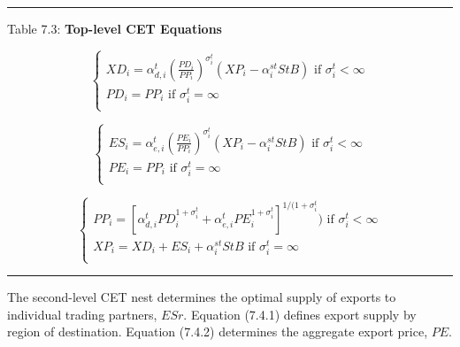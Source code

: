 \documentclass{article}
\begin{document}
\newpage
\noindent\rule{\linewidth}{0.4pt}
\begin{center}
\begin{large}
{\centering Table 7.3: \textbf{Top-level CET Equations} \par}

\begin{equation}
    \begin{cases}
      XD_i = \alpha^t_{d, i} \left(\frac{PD_i}{PP_i} \right)^{\sigma^t_i} \left(XP_i - \alpha^{st}_i StB \right) \text{ if } \sigma^t_i < \infty\\
      PD_i = PP_i \text{ if } \sigma^t_i = \infty\\
    \end{cases}       
    \tag{7.3.1}
\end{equation}

\begin{equation}
    \begin{cases}
      ES_i = \alpha^t_{e, i} \left(\frac{PE_i}{PP_i} \right)^{\sigma^t_i} \left(XP_i - \alpha^{st}_i StB \right) \text{ if } \sigma^t_i < \infty\\
      PE_i = PP_i \text{ if } \sigma^t_i = \infty\\
    \end{cases}       
    \tag{7.3.2} 
\end{equation}

\begin{equation}
    \begin{cases}
      PP_i = \left[\alpha^t_{d, i} PD^{1 + \sigma^t_i}_i + \alpha^t_{e, i} PE^{1 + \sigma^t_i}_i \right]^{1/(1+ \sigma^t_i}) \text{ if } \sigma^t_i < \infty\\
      XP_i = XD_i +ES_i + \alpha^{st}_i StB \text{ if } \sigma^t_i = \infty\\
    \end{cases}       
    \tag{7.3.3}
\end{equation}

\end{large}
\end{center}
\noindent\rule{\linewidth}{0.4pt}

The second-level CET nest determines the optimal supply of exports to individual trading partners, $ESr$. Equation (7.4.1) defines export supply by region of destination. Equation (7.4.2) determines the aggregate export price, $PE$.
\end{document}
